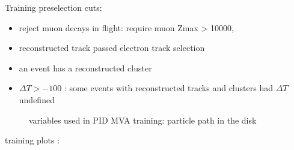 Training preselection cuts:

\begin{itemize}
\item 
  reject muon decays in flight: require muon Zmax > 10000,
\item 
  reconstructed track passed electron track selection
\item 
  an event has a reconstructed cluster 
\item 
  $\Delta T > -100$ : some events with reconstructed tracks and clusters had $\Delta T$ undefined
\end{itemize}

\begin{figure}
  \label{fig:pid_training_2}
  \caption{
    variables used in PID MVA training: particle path in the disk
  }
\end{figure}


training plots :

